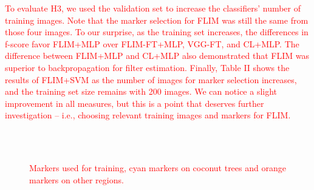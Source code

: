 \documentclass[journal, twoside]{IEEEtran}
\begin{document}
\textcolor{red}{To evaluate H3, we used the validation set to increase the classifiers' number of training images. Note that the marker selection for FLIM was still the same from those four images. To our surprise, as the training set increases, the differences in f-score favor FLIM+MLP over FLIM-FT+MLP, VGG-FT, and CL+MLP. The difference between FLIM+MLP and CL+MLP also demonstrated that FLIM was superior to backpropagation for filter estimation. Finally, Table II shows the results of FLIM+SVM as the number of images for marker selection increases, and the training set size remains with 200 images. We can notice a slight improvement in all measures, but this is a point that deserves further investigation -- i.e., choosing relevant training images and markers for FLIM.}  

\begin{figure}[!t]
    \centering
    ~
    \\
    ~
    \caption{\textcolor{red}{Markers used for training, cyan markers on coconut trees and orange markers on other regions.}}
    \label{fig:markers}
\end{figure}
\end{document}
